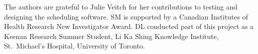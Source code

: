 The authors are grateful to Julie Veitch for her contributions to testing and
designing the scheduling software. SM is supported by a Canadian Institutes of
Health Research New Investigator Award. DL conducted part of this project as a
Keenan Research Summer Student, Li Ka Shing Knowledge Institute, St.\ Michael's
Hospital, University of Toronto.
